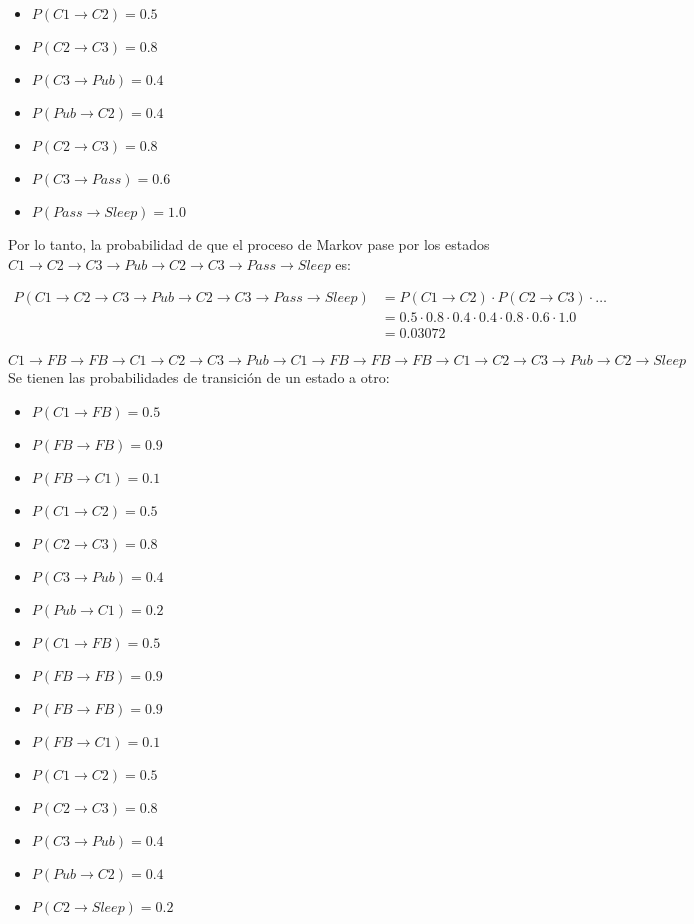 \begin{itemize}
    \item $P(C1 \rightarrow C2) = 0.5$
    \item $P(C2 \rightarrow C3) = 0.8$
    \item $P(C3 \rightarrow Pub) = 0.4$
    \item $P(Pub \rightarrow C2) = 0.4$
    \item $P(C2 \rightarrow C3) = 0.8$
    \item $P(C3 \rightarrow Pass) = 0.6$
    \item $P(Pass \rightarrow Sleep) = 1.0$
\end{itemize}

Por lo tanto, la probabilidad de que el proceso de Markov pase por los estados $C1 \rightarrow C2 \rightarrow C3 \rightarrow Pub \rightarrow C2 \rightarrow C3 \rightarrow Pass \rightarrow Sleep$ es:

\begin{align*}
    P(C1 \rightarrow C2 \rightarrow C3 \rightarrow Pub \rightarrow C2 \rightarrow C3 \rightarrow Pass \rightarrow Sleep) & = P(C1 \rightarrow C2) \cdot P(C2 \rightarrow C3) \cdot \ldots \\
    &= 0.5 \cdot 0.8 \cdot 0.4 \cdot 0.4 \cdot 0.8 \cdot 0.6 \cdot 1.0\\
    &= 0.03072
\end{align*}

\indent $C1 \rightarrow FB \rightarrow FB \rightarrow C1 \rightarrow C2 \rightarrow C3 \rightarrow Pub \rightarrow C1 \rightarrow FB \rightarrow FB \rightarrow FB \rightarrow C1 \rightarrow C2 \rightarrow C3 \rightarrow Pub \rightarrow C2 \rightarrow Sleep$\\

Se tienen las probabilidades de transición de un estado a otro:

\begin{itemize}
    \item $P(C1 \rightarrow FB) = 0.5$
    \item $P(FB \rightarrow FB) = 0.9$
    \item $P(FB \rightarrow C1) = 0.1$
    \item $P(C1 \rightarrow C2) = 0.5$
    \item $P(C2 \rightarrow C3) = 0.8$
    \item $P(C3 \rightarrow Pub) = 0.4$
    \item $P(Pub \rightarrow C1) = 0.2$
    \item $P(C1 \rightarrow FB) = 0.5$
    \item $P(FB \rightarrow FB) = 0.9$
    \item $P(FB \rightarrow FB) = 0.9$
    \item $P(FB \rightarrow C1) = 0.1$
    \item $P(C1 \rightarrow C2) = 0.5$
    \item $P(C2 \rightarrow C3) = 0.8$
    \item $P(C3 \rightarrow Pub) = 0.4$
    \item $P(Pub \rightarrow C2) = 0.4$
    \item $P(C2 \rightarrow Sleep) = 0.2$
\end{itemize}


